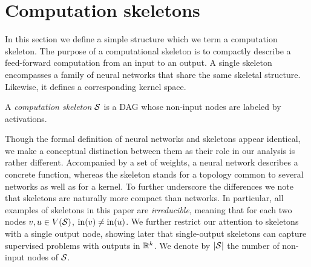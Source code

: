 \section{Computation skeletons}
%
In this section we define a simple structure which we term a computation
skeleton. The purpose of a computational skeleton is to compactly describe
a feed-forward computation from an input to an output. A single skeleton encompasses a family of neural networks
that share the same skeletal structure. Likewise, it defines a
corresponding kernel space.
%
\begin{definition} A {\em computation skeleton} ${\cal S}$ is a DAG whose
non-input nodes are labeled by activations.
\end{definition}
%
Though the formal definition of neural networks and skeletons appear
identical, we make a conceptual distinction between them as their role in
our analysis is rather different. Accompanied by a set of weights, a neural
network describes a concrete function, whereas the skeleton stands for a
topology common to several networks as well as for a kernel.
To further underscore the differences we note that skeletons are naturally more compact than networks. In particular, all examples of
skeletons in this paper are {\em irreducible}, meaning that for
each two nodes $v,u\in{}V({\cal S})$, $\mathrm{in}(v)\neq\mathrm{in}(u)$.
We further restrict our attention
to skeletons with a single output node, showing later that single-output
skeletons can capture supervised problems with outputs in ${\mathbb R}^k$. We
denote by $|{\cal S}|$ the number of non-input nodes of ${\cal S}$.

